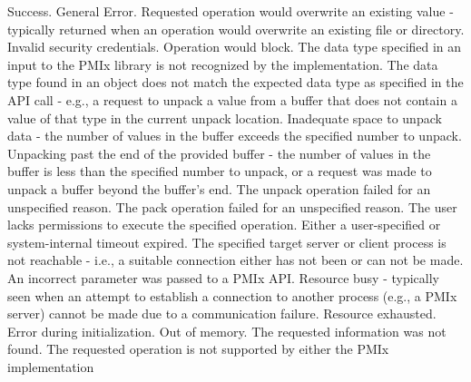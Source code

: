 \begin{constantdesc}
%
Success.
%
General Error.
%
Requested operation would overwrite an existing value - typically returned
when an operation would overwrite an existing file or directory.
%
Invalid security credentials.
%
Operation would block.
%
The data type specified in an input to the \ac{PMIx} library is not recognized
by the implementation.
%
The data type found in an object does not match the expected data type
as specified in the \ac{API} call - e.g., a request to unpack a
 value from a buffer that does not contain a value of
that type in the current unpack location.
%
Inadequate space to unpack data - the number of values in the buffer exceeds
the specified number to unpack.
%
Unpacking past the end of the provided buffer - the number of values in the
buffer is less than the specified number to unpack, or a request was made to
unpack a buffer beyond the buffer's end.
%
The unpack operation failed for an unspecified reason.
%
The pack operation failed for an unspecified reason.
%
The user lacks permissions to execute the specified operation.
%
Either a user-specified or system-internal timeout expired.
%
The specified target server or client process is not reachable - i.e., a
suitable connection either has not been or can not be made.
%
An incorrect parameter was passed to a \ac{PMIx} \ac{API}.
%
Resource busy - typically seen when an attempt to establish a connection
to another process (e.g., a \ac{PMIx} server) cannot be made due to a
communication failure.
%
Resource exhausted.
%
Error during initialization.
%
Out of memory.
%
The requested information was not found.
%
The requested operation is not supported by either the \ac{PMIx} implementation

\end{constantdesc}
